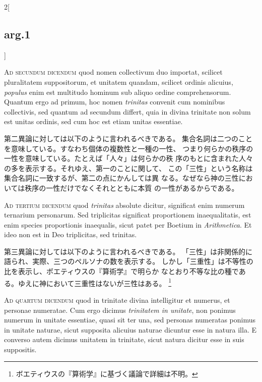 \documentclass[paper=a4paper,fontsize=10pt,jafontsize=9pt,titlepage]{jlreq}
\begin{document}
\begin{paracol}{2}[\subsection{arg.1}]
\switchcolumn*[\subsection{ad.2}]

{\scshape Ad secundum dicendum} quod nomen collectivum duo importat, scilicet
pluralitatem suppositorum, et unitatem quandam, scilicet ordinis
alicuius, {\itshape populus} enim est multitudo hominum sub aliquo ordine
comprehensorum. Quantum ergo ad primum, hoc nomen {\itshape trinitas} convenit
cum nominibus collectivis, sed quantum ad secundum differt, quia in
divina trinitate non solum est unitas ordinis, sed cum hoc est etiam
unitas essentiae.

\switchcolumn

第二異論に対しては以下のように言われるべきである。
集合名詞は二つのことを意味している。すなわち個体の複数性と一種の一性、
 つまり何らかの秩序の一性を意味している。たとえば「人々」は何らかの秩
 序のもとに含まれた人々の多を表示する。それゆえ、第一のことに関して、
 この「三性」という名称は集合名詞に一致するが、第二の点にかんしては異
 なる。なぜなら神の三性においては秩序の一性だけでなくそれとともに本質
 の一性があるからである。

\switchcolumn*[\subsection{ad.3}]

{\scshape Ad tertium dicendum} quod {\itshape trinitas} absolute dicitur, significat enim
numerum ternarium personarum. Sed triplicitas significat proportionem
inaequalitatis, est enim species proportionis inaequalis, sicut patet
per Boetium in {\itshape Arithmetica}. Et ideo non est in Deo triplicitas, sed
trinitas.

\switchcolumn

第三異論に対しては以下のように言われるべきである。
「三性」は非関係的に語られ、実際、三つのペルソナの数を表示する。
しかし「三重性」は不等性の比を表示し、ボエティウスの『算術学』で明らか
 なとおり不等な比の種である。ゆえに神において三重性はないが三性はある。
 \footnote{ボエティウスの『算術学』に基づく議論で詳細は不明。}

\switchcolumn*[\subsection{ad.4}]

{\scshape Ad quartum dicendum} quod in trinitate divina intelligitur et numerus,
et personae numeratae. Cum ergo dicimus {\itshape trinitatem in unitate}, non
ponimus numerum in unitate essentiae, quasi sit ter una, sed personas
numeratas ponimus in unitate naturae, sicut supposita alicuius naturae
dicuntur esse in natura illa. E converso autem dicimus unitatem in
trinitate, sicut natura dicitur esse in suis suppositis.


\end{paracol}
\end{document}
